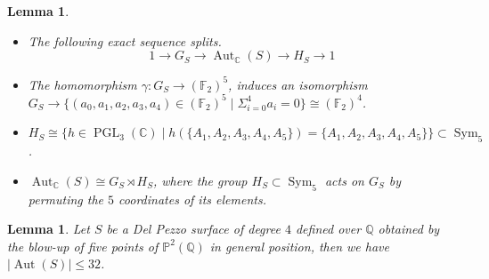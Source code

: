 \documentclass[leqno,12pt]{amsart} %
\newtheorem{lem}[thm]{Lemma}
\newcommand{\Q}{\ensuremath{\mathbb{Q} }}
\newcommand{\F}{\ensuremath{\mathbb{F} }}
\newcommand{\C}{\ensuremath{\mathbb{C} }}
\newcommand{\p}{\ensuremath{\mathbb{P} }}
\DeclareMathOperator{\PGL}{PGL}
\DeclareMathOperator{\Aut}{Aut}
\DeclareMathOperator{\sym}{Sym}
\begin{document}
\begin{lem}\cite[Lemma $9.11$]{MR2486798}\label{lemm-15}
    \begin{itemize}
\item The following exact sequence splits.
\begin{equation}\label{exact2:DelPezzo4}
    1\rightarrow G_{S}\rightarrow \Aut_{\C }(S)\rightarrow H_{S}\rightarrow 1
\end{equation}
\item The homomorphism $\gamma:G_S\rightarrow(\F _2)^5$, induces an isomorphism $G_{S}\rightarrow\{(a_0,a_1,a_2,a_3,a_4)\in(\F _2)^5\mid \Sigma_{i=0}^{4} a_i=0\}\cong(\F _2)^4$.
\item  $H_{S}\cong\{h\in \PGL _3(\C )\mid h(\{A_1,A_2,A_3,A_4,A_5\})=\{A_1,A_2,A_3,A_4,A_5\}\}\subset \sym_5$.
\item $\Aut_{\C }(S)\cong G_{S}\rtimes H_{S}$, where the group $H_{S}\subset\sym_5$ acts on $G_{S}$ by permuting the $5$ coordinates of its elements.
\end{itemize}
\end{lem}
 
\begin{lem}\label{lemm-16}
Let $S$ be a Del Pezzo surface of degree $4$ defined over $\Q $ obtained by the blow-up of five points of $\p^2(\Q )$ in general position, then we have $\mid \Aut(S)\mid \le 32$.
\end{lem}
 
\end{document}
